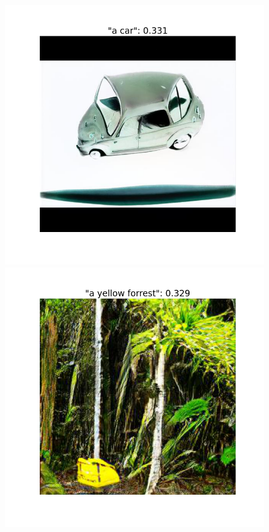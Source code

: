 \documentclass[12pt,a4paper,openany]{book}
\begin{document}
\begin{figure}[!htb]
  \includegraphics[width=\linewidth]{figs/a car_cossim.png}
\endminipage\hfill
{}
  \includegraphics[width=\linewidth]{a yellow forrest_cossim.png}

\end{figure}
\end{document}
